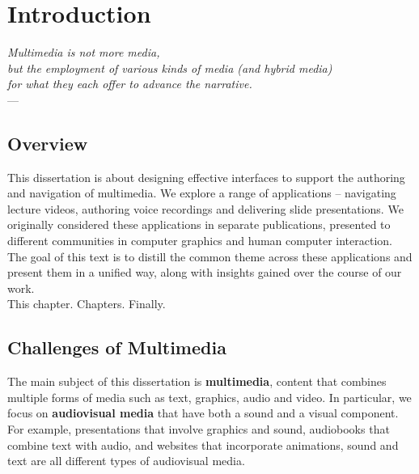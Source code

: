 
\chapter{Introduction} %

\label{ch:introduction} %

\begin{flushright}{\slshape    
Multimedia is not more media, \\ 
but the employment of various kinds of media (and hybrid media) \\ 
for what they each offer to advance the narrative.} \\ \medskip
---  \citep{ritchin:2013}
\end{flushright}

\section{Overview}
This dissertation is about designing effective interfaces to support the authoring and navigation of multimedia. We explore a range of applications -- navigating lecture videos, authoring voice recordings and delivering slide presentations. We originally considered these applications in separate publications, presented to different communities in computer graphics and human computer interaction. The goal of this text is to distill the common theme across these applications and present them in a unified way, along with insights gained over the course of our work.\\
This chapter. Chapters. Finally. 

\section{Challenges of Multimedia}
The main subject of this dissertation is \textbf{multimedia}, content that combines multiple forms of media such as text, graphics, audio and video. In particular, we focus on \textbf{audiovisual media} that have both a sound and a visual component. For example, presentations that involve graphics and sound, audiobooks that combine text with audio, and websites that incorporate animations, sound and text are all different types of audiovisual media. \\

